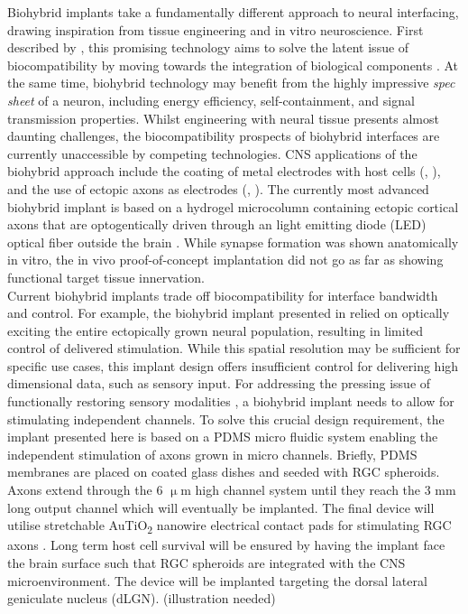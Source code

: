 Biohybrid implants take a fundamentally different approach to neural
interfacing, drawing inspiration from tissue engineering and in vitro
neuroscience. First described by \cite{biohybridfirst}, this promising
technology aims to solve the latent issue of biocompatibility by moving towards
the integration of biological components \parencite{biohybridreview}. At the
same time, biohybrid technology may benefit from the highly impressive
\textit{spec sheet} of a neuron, including energy efficiency, self-containment,
and signal transmission properties. Whilst engineering with neural tissue
presents almost daunting challenges, the biocompatibility prospects of biohybrid
interfaces are currently unaccessible by competing technologies. CNS
applications of the biohybrid approach include the coating of metal electrodes
with host cells (\cite{seededelectrodes1}, \cite{seededelectrodes2}), and the
use of ectopic axons as electrodes (\cite{filmbasedinterface},
\cite{cullenrecent}). The currently most advanced biohybrid implant is based on
a hydrogel microcolumn containing ectopic cortical axons that are optogentically
driven through an light emitting diode (LED) optical fiber outside the brain
\parencite{cullenrecent}. While synapse formation was shown anatomically in
vitro, the in vivo proof-of-concept implantation did not go as far as showing
functional target tissue innervation. \\

Current biohybrid implants trade off biocompatibility for interface bandwidth
and control. For example, the biohybrid implant presented in \cite{cullenrecent}
relied on optically exciting the entire ectopically grown neural population,
resulting in limited control of delivered stimulation. While this spatial
resolution may be sufficient for specific use cases, this implant design offers
insufficient control for delivering high dimensional data, such as sensory
input. For addressing the pressing issue of functionally restoring sensory
modalities \parencite{blindnesssux}, a biohybrid implant needs to allow for
stimulating independent channels. To solve this crucial design requirement, the
implant presented here is based on a PDMS micro fluidic system enabling the
independent stimulation of axons grown in micro channels. Briefly, PDMS
membranes are placed on coated glass dishes and seeded with RGC spheroids. Axons
extend through the 6 $\upmu$m high channel system until they reach the 3 mm long
output channel which will eventually be implanted. The final device will utilise
stretchable AuTiO\textsubscript{2} nanowire electrical contact pads for
stimulating RGC axons \parencite{nanowires}. Long term host cell survival will
be ensured by having the implant face the brain surface such that RGC spheroids
are integrated with the CNS microenvironment. The device will be implanted
targeting the dorsal lateral geniculate nucleus (dLGN). (illustration needed) 



